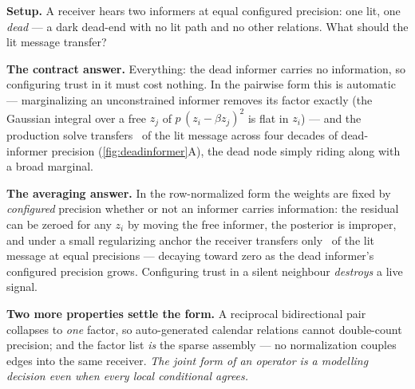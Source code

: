 \documentclass[11pt]{article}
\begin{document}
\begin{example}[title={Case file: the dead informer}]
\textbf{Setup.}  A receiver hears two informers at equal configured
precision: one lit, one \emph{dead} --- a dark dead-end with no lit path
and no other relations.  What should the lit message transfer?

\textbf{The contract answer.}  Everything: the dead informer carries no
information, so configuring trust in it must cost nothing.  In the
pairwise form this is automatic --- marginalizing an unconstrained
informer removes its factor exactly (the Gaussian integral over a free
$z_j$ of $p\,(z_i-\beta z_j)^2$ is flat in $z_i$) --- and the production
solve transfers \gtppairflat\ of the lit message across four decades of
dead-informer precision (\cref{fig:deadinformer}A), the dead node simply
riding along with a broad marginal.

\textbf{The averaging answer.}  In the row-normalized form the weights are
fixed by \emph{configured} precision whether or not an informer carries
information: the residual can be zeroed for any $z_i$ by moving the free
informer, the posterior is improper, and under a small regularizing anchor
the receiver transfers only \gtpdeadhalf\ of the lit message at equal
precisions --- decaying toward zero as the dead informer's configured
precision grows.  Configuring trust in a silent neighbour \emph{destroys}
a live signal.

\textbf{Two more properties settle the form.}  A reciprocal bidirectional
pair collapses to \emph{one} factor, so auto-generated calendar relations
cannot double-count precision; and the factor list \emph{is} the sparse
assembly --- no normalization couples edges into the same receiver.
\emph{The joint form of an operator is a modelling decision even when
every local conditional agrees.}
\end{example}
\end{document}
